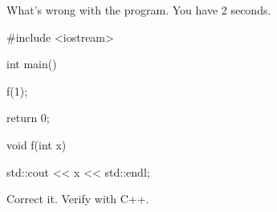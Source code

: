 What's wrong with the program. You have 2 seconds.

\begin{consolethree}[escapeinside=||]

#include <iostream>



int main()

{

    f(1);

    return 0;

}



void f(int x)

{

    std::cout << x << std::endl;

}

\end{consolethree}

Correct it. Verify with C++.

